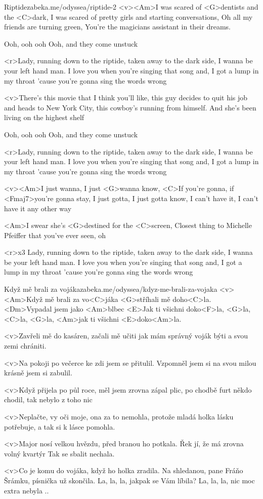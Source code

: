 \begin{song}{3}{Riptide}{zabeka.me/odyssea/riptide-2}
	<v><Am>I was scared of <G>dentists and the <C>dark,
	I was scared of pretty girls and starting conversations,
	Oh all my friends are turning green,
	You're the magicians assistant in their dreams.

	Ooh, ooh ooh
	Ooh, and they come unstuck

	<r>Lady, running down to the riptide,
	taken away to the dark side,
	I wanna be your left hand man.
	I love you when you're singing that song and,
	I got a lump in my throat 'cause
	you're gonna sing the words wrong

	<v>There's this movie that I think you'll like,
	this guy decides to quit his job and heads to New York City,
	this cowboy's running from himself.
	And she's been living on the highest shelf

	Ooh, ooh ooh
	Ooh, and they come unstuck

	<r>Lady, running down to the riptide,
	taken away to the dark side,
	I wanna be your left hand man.
	I love you when you're singing that song and,
	I got a lump in my throat 'cause
	you're gonna sing the words wrong

	<v><Am>I just wanna, I just <G>wanna know,
	<C>If you're gonna, if <Fmaj7>you're gonna stay,
	I just gotta, I just gotta know,
	I can't have it, I can't have it any other way

	<Am>I swear she's <G>destined for the <C>screen,
	Closest thing to Michelle Pfeiffer that you've ever seen, oh

	<r>x3
	Lady, running down to the riptide,
	taken away to the dark side,
	I wanna be your left hand man.
	I love you when you're singing that song and,
	I got a lump in my throat 'cause
	you're gonna sing the words wrong
\end{song}
\begin{song}{4}{Když mě brali za vojáka}{zabeka.me/odyssea/kdyz-me-brali-za-vojaka}
	<v><Am>Když mě brali za vo<C>jáka
	<G>stříhali mě doho<C>la.
	<Dm>Vypadal jsem jako <Am>blbec
	<E>Jak ti všichni doko<F>la,
	<G>la, <C>la, <G>la, <Am>jak ti všichni <E>doko<Am>la.

	<v>Zavřeli mě do kasáren,
	začali mě učiti
	jak mám správný voják býti
	a svou zemi chrániti.

	<v>Na pokoji po večerce
	ke zdi jsem se přitulil.
	Vzpomněl jsem si na svou milou
	krásně jsem si zabulil.

	<v>Když přijela po půl roce,
	měl jsem zrovna zápal plic,
	po chodbě furt někdo chodil,
	tak nebylo z toho nic

	<v>Neplačte, vy oči moje,
	ona za to nemohla,
	protože mladá holka lásku potřebuje,
	a tak si k lásce pomohla.

	<v>Major nosí velkou hvězdu,
	před branou ho potkala.
	Řek jí, že má zrovna volný kvartýr
	Tak se sbalit nechala.

	<v>Co je komu do vojáka,
	když ho holka zradila.
	Na shledanou, pane Fráňo Šrámku,
	písnička už skončila.
	La, la, la, jakpak se Vám líbila?
	La, la, la, nic moc extra nebyla ..
\end{song}
